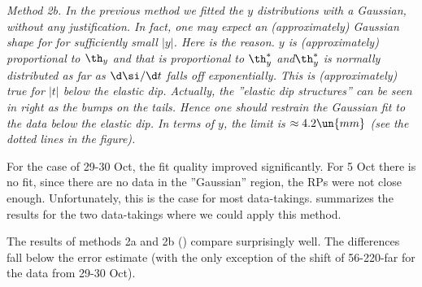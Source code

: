 


\em{Method 2b}. In the previous method we fitted the $y$ distributions with a Gaussian, without any justification. In fact, one may expect an (approximately) Gaussian shape for for sufficiently small $|y|$. Here is the reason. $y$ is (approximately) proportional to $\th_y$ and that is proportional to $\th_y^*$ and$\th_y^*$ is normally distributed as far as $\d\si/\d t$ falls off exponentially. This is (approximately) true for $|t|$ below the elastic dip. Actually, the ''elastic dip structures'' can be seen in  right as the bumps on the tails. Hence one should restrain the Gaussian fit to the data below the elastic dip. In terms of $y$, the limit is $\approx 4.2\un{mm}$ (see the dotted lines in the figure).

For the case of 29-30 Oct, the fit quality improved significantly. For 5 Oct there is no fit, since there are no data in the ''Gaussian'' region, the RPs were not close enough. Unfortunately, this is the case for most data-takings.  summarizes the results for the two data-takings where we could apply this method.

The results of methods 2a and 2b () compare surprisingly well. The differences fall below the error estimate (with the only exception of the shift of 56-220-far for the data from 29-30 Oct).


